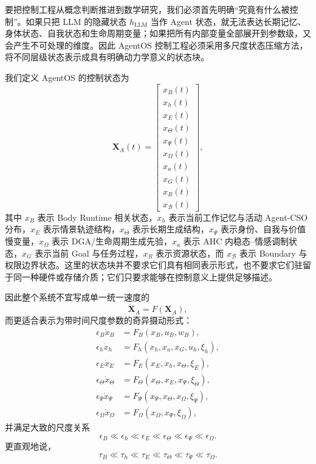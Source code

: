 要把控制工程从概念判断推进到数学研究，我们必须首先明确“究竟有什么被控制”。如果只把 LLM 的隐藏状态 $h_{\mathrm{LLM}}$ 当作 Agent 状态，就无法表达长期记忆、身体状态、自我状态和生命周期变量；如果把所有内部变量全部展开到参数级，又会产生不可处理的维度。因此 AgentOS 控制工程必须采用多尺度状态压缩方法，将不同层级状态表示成具有明确动力学意义的状态块。

我们定义 AgentOS 的控制状态为
\[
\mathbf X_A(t)
=
\begin{bmatrix}
x_B(t)\\
x_h(t)\\
x_E(t)\\
x_\Theta(t)\\
x_\Psi(t)\\
x_\Omega(t)\\
x_a(t)\\
x_G(t)\\
x_R(t)\\
x_{\mathcal B}(t)
\end{bmatrix},
\]
其中 $x_B$ 表示 Body Runtime 相关状态，$x_h$ 表示当前工作记忆与活动 Agent-CSO 分布，$x_E$ 表示情景轨迹结构，$x_\Theta$ 表示长期生成结构，$x_\Psi$ 表示身份、自我与价值慢变量，$x_\Omega$ 表示 DGA/生命周期生成先验，$x_a$ 表示 AHC 内稳态--情感调制状态，$x_G$ 表示当前 Goal 与任务过程，$x_R$ 表示资源状态，而 $x_{\mathcal B}$ 表示 Boundary 与权限边界状态。这里的状态块并不要求它们具有相同表示形式，也不要求它们驻留于同一种硬件或存储介质；它们只要求能够在控制意义上提供足够描述。

因此整个系统不宜写成单一统一速度的
\[
\dot{\mathbf X}_A=F(\mathbf X_A),
\]
而更适合表示为带时间尺度参数的奇异摄动形式：
\[
\begin{aligned}
\epsilon_B\dot{x}_B
&=
F_B(x_B,u_B,w_B),\\
\epsilon_h\dot{x}_h
&=
F_h(x_h,x_a,x_G,u_h,\xi_h),\\
\epsilon_E\dot{x}_E
&=
F_E(x_E,x_h,x_\Theta,\xi_E),\\
\epsilon_\Theta\dot{x}_\Theta
&=
F_\Theta(x_\Theta,x_E,x_\Psi,\xi_\Theta),\\
\epsilon_\Psi\dot{x}_\Psi
&=
F_\Psi(x_\Psi,x_\Theta,x_\Omega,\xi_\Psi),\\
\epsilon_\Omega\dot{x}_\Omega
&=
F_\Omega(x_\Omega,x_\Psi,\xi_\Omega),
\end{aligned}
\]
并满足大致的尺度关系
\[
\epsilon_B
\ll
\epsilon_h
\ll
\epsilon_E
\ll
\epsilon_\Theta
\ll
\epsilon_\Psi
\ll
\epsilon_\Omega.
\]
更直观地说，
\[
\tau_B
\ll
\tau_h
\ll
\tau_E
\ll
\tau_\Theta
\ll
\tau_\Psi
\ll
\tau_\Omega.
\]

